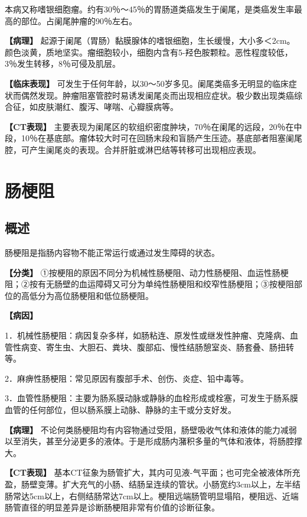 本病又称嗜银细胞瘤。约有30％～45％的胃肠道类癌发生于阑尾，是类癌发生率最高的部位。占阑尾肿瘤的90％左右。

\textbf{【病理】}
起源于阑尾（胃肠）黏膜腺体的嗜银细胞，生长缓慢，大小多＜2cm。颜色淡黄，质地坚实。瘤细胞较小，细胞内含有5-羟色胺颗粒。恶性程度较低，3％发生转移，8％可侵及肌层。

\textbf{【临床表现】}
可发生于任何年龄，以30～50岁多见。阑尾类癌多无明显的临床症状而偶然发现。肿瘤阻塞管腔时易诱发阑尾炎而出现相应症状。极少数出现类癌综合征，如皮肤潮红、腹泻、哮喘、心瓣膜病等。

\textbf{【CT表现】}
主要表现为阑尾区的软组织密度肿块，70％在阑尾的远段，20％在中段，10％在基底部。瘤体较大时可在回肠末段和盲肠产生压迹。基底部者阻塞阑尾腔，可产生阑尾炎的表现。合并肝脏或淋巴结等转移可出现相应表现。

\section{肠梗阻}

\subsection{概述}

肠梗阻是指肠内容物不能正常运行或通过发生障碍的状态。

\textbf{【分类】}
①按梗阻的原因不同分为机械性肠梗阻、动力性肠梗阻、血运性肠梗阻；②按有无肠壁的血运障碍又可分为单纯性肠梗阻和绞窄性肠梗阻；③按梗阻部位的高低分为高位肠梗阻和低位肠梗阻。

\textbf{【病因】}

1．机械性肠梗阻：病因复杂多样，如肠粘连、原发性或继发性肿瘤、克隆病、血管性病变、寄生虫、大胆石、粪块、腹部疝、慢性结肠憩室炎、肠套叠、肠扭转等。

2．麻痹性肠梗阻：常见原因有腹部手术、创伤、炎症、铅中毒等。

3．血管性肠梗阻：主要为肠系膜动脉或静脉的血栓形成或栓塞，可发生于肠系膜血管的任何部位，但以肠系膜上动脉、静脉的主干或分支好发。

\textbf{【病理】}
不论何类肠梗阻均有内容物通过受阻，肠壁吸收气体和液体的能力减弱以至消失，甚至分泌更多的液体。于是形成肠内潴积多量的气体和液体，将肠腔撑大。

\textbf{【CT表现】}
基本CT征象为肠管扩大，其内可见液-气平面；也可完全被液体所充盈，肠壁变薄。扩大充气的小肠、结肠呈连续的管状。小肠宽约3cm以上，左半结肠常达5cm以上，右侧结肠常达7cm以上。梗阻远端肠管明显塌陷，梗阻远、近端肠管直径的明显差异是诊断肠梗阻非常有价值的诊断征象。

